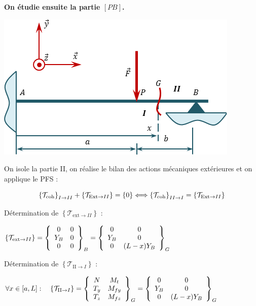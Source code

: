 \documentclass[10pt,fleqn]{article} %
\begin{document}
\begin{corrige}

\textbf{On étudie ensuite la partie $[PB]$.}
\begin{center}
\includegraphics[width=.45\textwidth]{images/fig_03}
\end{center}

On isole la partie II, on réalise le bilan des actions mécaniques extérieures et on applique le PFS : 

$$
\torseurscoh_{I \rightarrow II} + \left\{\mathcal{T}_{\text{Ext}\rightarrow II}\right\}  = \{0\}
\Longleftrightarrow \torseurscoh_{II \rightarrow I} = \left\{\mathcal{T}_{\text{Ext}\rightarrow II}\right\}  
$$


Détermination de $\left\{\mathcal{T}_{\text{ext}\rightarrow II}\right\}$ :


$\left\{\mathcal{T}_{\text{ext}\rightarrow II}\right\}
=  \torseurcol{0}{Y_B}{0}{0}{0}{0}{B} 
=  \torseurcol{0}{Y_B}{0}{0}{0}{(L-x) Y_B}{G} 
$ 



Détermination de $ \left\{\mathcal{T}_{\text{II}\rightarrow I}\right\}$ :

$
\forall x \in [a,L] : \quad 
\left\{\mathcal{T}_{\text{II}\rightarrow I}\right\} 
= \torseurcol{N}{T_y}{T_z}{M_t}{M_{fy}}{M_{fz}}{G}
=  \torseurcol{0}{Y_B}{0}{0}{0}{(L-x) Y_B}{G} 
$

\end{corrige}



\else
\fi

\end{document}
